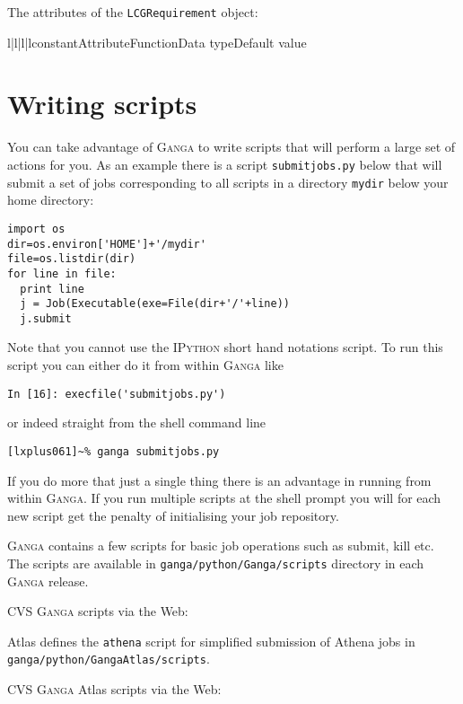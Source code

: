 \documentclass{howto}
\def\ganga {\textsc{Ganga}\xspace}
\def\ipython {\textsc{IPython}\xspace}
\begin{document}
The attributes of the \texttt{LCGRequirement} object:
\begin{tableiv}{l|l|l|l}{constant}{Attribute}{Function}{Data type}{Default value}
\end{tableiv}

\section{Writing scripts}
You can take advantage of \ganga to write scripts that will perform a large
set of actions for you. As an example there is a script \texttt{submitjobs.py}
below that will submit a set of jobs corresponding to all scripts in a
directory \texttt{mydir} below your home directory:
\begin{verbatim}
import os
dir=os.environ['HOME']+'/mydir'
file=os.listdir(dir)
for line in file:
  print line
  j = Job(Executable(exe=File(dir+'/'+line))
  j.submit

\end{verbatim}
Note that you cannot use the \ipython short hand notations script. To run
this script you can either do it from within \ganga like
\begin{verbatim}
In [16]: execfile('submitjobs.py')
\end{verbatim}
or indeed straight from the shell command line
\begin{verbatim}
[lxplus061]~% ganga submitjobs.py
\end{verbatim}
If you do more that just a single thing there is an advantage in running from
within \ganga. If you run multiple scripts at the shell prompt you will for
each new script get the penalty of initialising your job repository.

\begin{seealso}

\ganga contains a few scripts for basic job operations such as submit, kill etc. The scripts
are available in {\tt ganga/python/Ganga/scripts} directory in each \ganga release.

CVS \ganga scripts via the Web:

Atlas defines the {\tt athena} script for simplified submission of Athena jobs in {\tt ganga/python/GangaAtlas/scripts}.

CVS \ganga Atlas scripts via the Web:
\end{seealso}
\end{document}
